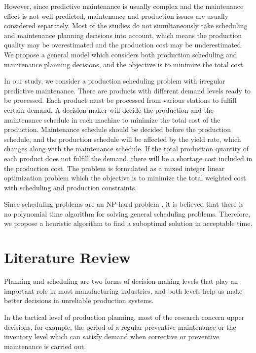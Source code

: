\documentclass[12pt,a4page]{article}
\theoremstyle{definition}
\theoremstyle{remark}
\begin{document}
However, since predictive maintenance is usually complex and the maintenance effect is not well predicted, maintenance and production issues are usually considered separately. Most of the studies do not simultaneously take scheduling and maintenance planning decisions into account, which means the production quality may be overestimated and the production cost may be underestimated. We propose a general model which considers both production scheduling and maintenance planning decisions, and the objective is to minimize the total cost.

In our study, we consider a production scheduling problem with irregular predictive maintenance. There are products with different demand levels ready to be processed. Each product must be processed from various stations to fulfill certain demand. A decision maker will decide the production and the maintenance schedule in each machine to minimize the total cost of the production. Maintenance schedule should be decided before the production schedule, and the production schedule will be affected by the yield rate, which changes along with the maintenance schedule. If the total  production quantity of each product does not fulfill the demand, there will be a shortage cost included in the production cost.  The problem is formulated as a mixed integer linear optimization problem which the objective is to minimize the total weighted cost with scheduling and production constraints.

Since scheduling problems are an NP-hard problem \citep{ullman1975np}, it is believed that there is no polynomial time algorithm for solving general scheduling problems. Therefore, we propose a heuristic algorithm to find a suboptimal solution in acceptable time.


\section{Literature Review}
\label{ch-review}

Planning and scheduling are two forms of decision-making levels that play an important role in most manufacturing industries, and both levels help us make better decisions in unreliable production systems.

In the tactical level of production planning, most of the research concern upper decisions, for example, the period of a regular preventive maintenance or the inventory level which can satisfy demand when corrective or preventive maintenance is carried out.
\end{document}
